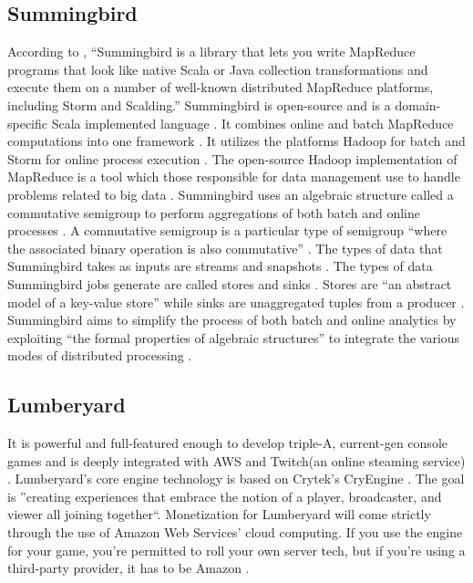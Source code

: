     
\subsection{ Summingbird}
     
     According to \cite{summingbirdgit}, ``Summingbird is
     a library that lets you write MapReduce programs that look like
     native Scala or Java collection transformations and execute them
     on a number of well-known distributed MapReduce platforms,
     including Storm and Scalding.''  Summingbird is open-source and is
     a domain-specific Scala implemented language
     \cite{boykin2014summingbird}. It combines online and batch
     MapReduce computations into one framework
     \cite{boykin2014summingbird}. It utilizes the platforms Hadoop
     for batch and Storm for online process execution
     \cite{boykin2014summingbird}. The open-source Hadoop
     implementation of MapReduce is a tool which those responsible for
     data management use to handle problems related to big data
     \cite{boykin2014summingbird}. Summingbird uses an algebraic
     structure called a commutative semigroup to perform aggregations
     of both batch and online processes
     \cite{boykin2014summingbird}. A commutative semigroup is a
     particular type of semigroup ``where the associated binary
     operation is also commutative'' \cite{boykin2014summingbird}.
     The types of data that Summingbird takes as inputs are streams
     and snapshots \cite{boykin2014summingbird}. The types of data
     Summingbird jobs generate are called stores and sinks
     \cite{boykin2014summingbird}. Stores are ``an abstract model of a
     key-value store'' while sinks are unaggregated tuples from a
     producer \cite{boykin2014summingbird}. Summingbird aims to
     simplify the process of both batch and online analytics by
     exploiting ``the formal properties of algebraic structures'' to
     integrate the various modes of distributed processing
     \cite{boykin2014summingbird}.
	   
\subsection{ Lumberyard}
     
     It is powerful and full-featured enough to develop triple-A,
     current-gen console games and is deeply integrated with AWS and
     Twitch(an online steaming service)
     \cite{gamasutra}. Lumberyard's core engine technology is based
     on Crytek's CryEngine \cite{hands}. The goal is ''creating
     experiences that embrace the notion of a player, broadcaster, and
     viewer all joining together``\cite{gamasutra}. Monetization for
     Lumberyard will come strictly through the use of Amazon Web
     Services' cloud computing. If you use the engine for your game,
     you're permitted to roll your own server tech, but if you're
     using a third-party provider, it has to be Amazon \cite{what}.

